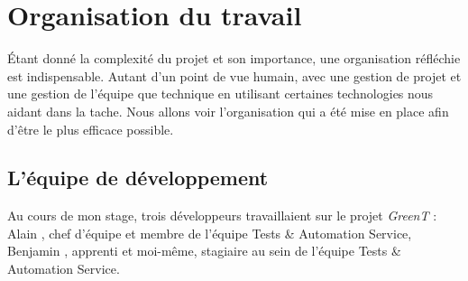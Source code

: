 \chapter{Organisation du travail}\label{chapOrganization}
\putminitoc \'Etant donné la complexité du projet et son importance, une organisation réfléchie est indispensable. Autant d'un point de vue humain, avec une gestion de projet et une gestion de l'équipe que technique en utilisant certaines technologies nous aidant dans la tache.  Nous allons voir l'organisation qui a été mise en place afin d'être le plus efficace possible.
\vspace{-32px}

\section{L'équipe de développement}
Au cours de mon stage, trois développeurs travaillaient sur le projet \textit{GreenT} : Alain , chef d’équipe et membre de
l’équipe Tests \& Automation Service, Benjamin , apprenti et moi-même, stagiaire au sein de l’équipe Tests \& Automation Service.





